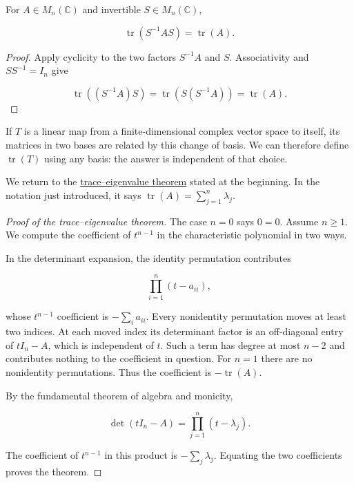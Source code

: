 \begin{corollary}\label{linear-algebra.trace-similarity}

For $A\in M_n(\mathbb C)$ and invertible $S\in M_n(\mathbb C)$,

\[
\operatorname{tr}(S^{-1}AS)=\operatorname{tr}(A).
\]
\end{corollary}

\begin{proof} Apply cyclicity to the two factors $S^{-1}A$ and $S$. Associativity and $SS^{-1}=I_n$ give

\[
\operatorname{tr}((S^{-1}A)S)
=\operatorname{tr}(S(S^{-1}A))
=\operatorname{tr}(A).
\]
\end{proof}

\begin{definition}\label{linear-algebra.endomorphism-trace}
If $T$ is a linear map from a finite-dimensional complex vector space to itself, its matrices in two bases are related by this change of basis. We can therefore define $\operatorname{tr}(T)$ using any basis: the answer is independent of that choice.
\end{definition}

We return to the \hyperref[linear-algebra.trace-eigenvalue-sum]{trace--eigenvalue theorem} stated at the beginning. In the notation just introduced, it says $\operatorname{tr}(A)=\sum_{j=1}^{n}\lambda_j$.

\begin{proof}[Proof of the trace--eigenvalue theorem] The case $n=0$ says $0=0$. Assume $n\geq1$. We compute the coefficient of $t^{n-1}$ in the characteristic polynomial in two ways.

In the determinant expansion, the identity permutation contributes

\[
\prod_{i=1}^{n}(t-a_{ii}),
\]

whose $t^{n-1}$ coefficient is $-\sum_i a_{ii}$. Every nonidentity permutation moves at least two indices. At each moved index its determinant factor is an off-diagonal entry of $tI_n-A$, which is independent of $t$. Such a term has degree at most $n-2$ and contributes nothing to the coefficient in question. For $n=1$ there are no nonidentity permutations. Thus the coefficient is $-\operatorname{tr}(A)$.

By the fundamental theorem of algebra and monicity,

\[
\det(tI_n-A)=\prod_{j=1}^{n}(t-\lambda_j).
\]

The coefficient of $t^{n-1}$ in this product is $-\sum_j\lambda_j$. Equating the two coefficients proves the theorem.
\end{proof}

